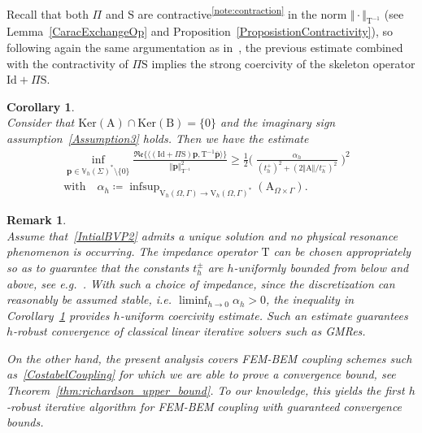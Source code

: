 \documentclass[a4paper,11pt]{article}
\newcommand{\mrm}{\mathrm}
\newcommand{\mA}{\mathrm{A}}
\newcommand{\mB}{\mathrm{B}}
\newcommand{\Id}{\mathrm{Id}}
\newcommand{\mT}{\mathrm{T}}
\newcommand{\mS}{\mathrm{S}}
\newcommand{\mbV}{\mathbb{V}}
\newcommand{\Vh}{\mathrm{V}_{h}}
\newcommand{\infsup}{\mathop{\mrm{infsup}}}
\newcommand{\bp}{\boldsymbol{p}}
\renewcommand{\Re}{\mathfrak{Re}} %
\newtheorem{cor}[defn]{Corollary}
\newtheorem{rem}[defn]{Remark}
\begin{document}
Recall that both $\Pi$ and $\mS$ are contractive\textsuperscript{\ref{note:contraction}} in the norm $\Vert
\cdot\Vert_{\mT^{-1}}$ (see Lemma~\ref{CaracExchangeOp} and Proposition~\ref{ProposistionContractivity}), so following again the same
argumentation as in~\cite[Corollary 6.2]{MR4648528}, the previous
estimate combined with the contractivity of $\Pi\mS$ implies the
strong coercivity of the skeleton operator $\Id+\Pi\mS$.

\begin{cor}\label{CoercivityProperty}\quad\\
  Consider that $\mrm{Ker}(\mA)\cap\mrm{Ker}(\mB) = \{0\}$ and the imaginary sign assumption~\eqref{Assumption3} holds.
  Then we have the estimate
  \begin{equation*}
    \begin{aligned}
      \inf_{\bp\in \mbV_h(\Sigma)^*\setminus\{0\}}\frac{\Re \{\langle
        (\Id+\Pi\mS)\bp, \mT^{-1}\overline{\bp}\rangle\}}{\Vert
        \bp\Vert_{\mT^{-1}}^{2}}\geq \frac{1}{2}
      \Big(\;\frac{\alpha_h}{ (t_h^+)^2+(2\Vert
        \mA\Vert/t_h^-)^2}\;\Big)^{2} &\\[10pt]
      \text{with}\quad\alpha_h\coloneq \infsup_{\Vh(\Omega,\Gamma)\to
        \Vh(\Omega,\Gamma)^*}(\mA_{\Omega\times\Gamma}). &
    \end{aligned}
  \end{equation*}
\end{cor}

\begin{rem}\label{rem:hrobustness}\quad\\
  Assume that~\eqref{IntialBVP2} admits a unique solution and no
  physical resonance phenomenon is occurring. The impedance operator
  $\mT$ can be chosen appropriately so as to guarantee that the
  constants $t_h^{\pm}$ are $h$-uniformly bounded from below and above,
  see e.g.~\cite{MR4433119}. With such a choice of impedance, since
  the discretization can reasonably be assumed stable,
  i.e. $\liminf_{h\to 0}\alpha_h>0$, the inequality in Corollary~\ref{CoercivityProperty} provides $h$-uniform coercivity
  estimate. Such an estimate guarantees $h$-robust convergence of classical
  linear iterative solvers such as GMRes.
  
  On the other hand, the present analysis covers FEM-BEM
  coupling schemes such as~\eqref{CostabelCoupling} for which we are
  able to prove a convergence bound, see Theorem~\ref{thm:richardson_upper_bound}. To our knowledge, this yields the
  first $h$-robust iterative algorithm for FEM-BEM coupling with
  guaranteed convergence bounds.
\end{rem}
\end{document}
